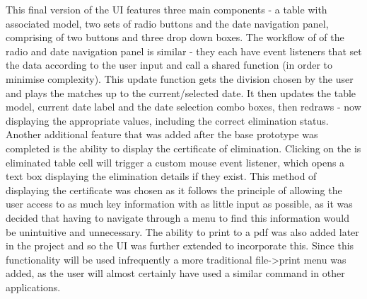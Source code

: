 This final version of the UI features three main components - a table with associated model, 
two sets of radio buttons and the date navigation panel, comprising of two buttons and three
drop down boxes. The workflow of of the radio and date navigation panel is similar - they each
have event listeners that set the data according to the user input and call a shared function 
(in order to minimise complexity). This update function gets the division chosen
by the user and plays the matches up to the current/selected date. It then updates the table 
model, current date label and the date selection combo boxes, then redraws - now displaying the 
appropriate values, including the correct elimination status. Another additional feature that was
added after the base prototype was completed is the ability to display the certificate of elimination.
Clicking on the is eliminated table cell will trigger a custom mouse event listener, which opens a 
text box displaying the elimination details if they exist. This method of displaying the certificate
was chosen as it follows the principle of allowing the user access to as much key information with as
little input as possible, as it was decided that having to navigate through a menu to find this 
information would be unintuitive and unnecessary. The ability to print to a pdf was also added later
in the project and so the UI was further extended to incorporate this. Since this functionality will be
used infrequently a more traditional file->print menu was added, as the user will almost certainly
have used a similar command in other applications.